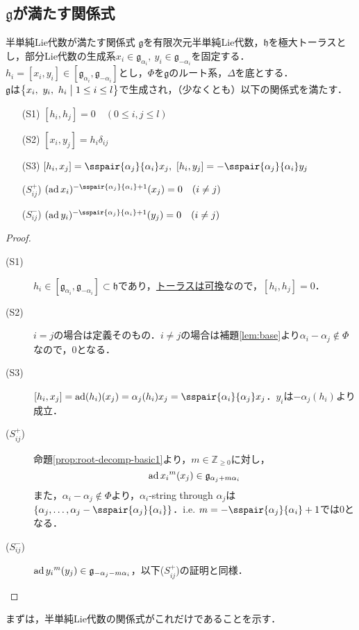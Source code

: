 \documentclass[rep_main]{subfiles}
\begin{document}
\subsection{$\mathfrak{g}$が満たす関係式}
\begin{myprop}[label=prop:semisimple-Lie-alg-relation]{半単純Lie代数が満たす関係式}
	$\mathfrak{g}$を有限次元半単純Lie代数，$\mathfrak{h}$を極大トーラスとし，部分Lie代数の生成系$x_i \in \mathfrak{g}_{\alpha_i},\ y_i \in \mathfrak{g}_{-\alpha_i}$を固定する．$h_i = [x_i, y_i] \in [\mathfrak{g}_{\alpha_i}, \mathfrak{g}_{-\alpha_i}]$とし，$\Phi$を$\mathfrak{g}$のルート系，$\Delta$を底とする．\\
	$\mathfrak{g}$は$\bigl\{ x_i,\ y_i,\ h_i \bigm| 1 \leq i \leq l \bigr\}$で生成され，（少なくとも）以下の関係式を満たす．
	\begin{enumerate}
		\item[(S1)] $[h_i, h_j] = 0\quad  (0 \leq i, j \leq l)$
		\item[(S2)] $[x_i, y_j] = h_i\delta_{ij}$
		\item[(S3)] $[h_i, x_j] = \sspair{\alpha_j}{\alpha_i}x_j,\ [h_i, y_j] = -\sspair{\alpha_j}{\alpha_i}y_j$
		\item[($S_{ij}^+$)] $(\ad x_i)^{-\sspair{\alpha_j}{\alpha_i} + 1}(x_j) = 0\quad  (i \neq j)$
		\item[($S_{ij}^-$)] $(\ad y_i)^{-\sspair{\alpha_j}{\alpha_i} + 1}(y_j) = 0\quad  (i \neq j)$
	\end{enumerate}
\end{myprop}
\begin{proof}
	\begin{description}
		\item[(S1)] $h_i  \in [\mathfrak{g}_{\alpha_i}, \mathfrak{g}_{-\alpha_i}] \subset \mathfrak{h}$であり，\hyperref[lem:torus]{トーラスは可換}なので，$[h_i, h_j] = 0$．
		\item[(S2)] $i = j$の場合は定義そのもの．$i \neq j$の場合は補題\ref{lem:base}より$\alpha_i - \alpha_j \notin \Phi$なので，$0$となる．
		\item[(S3)] $[h_i, x_j] = \ad(h_i)(x_j) = \alpha_j(h_i)x_j = \sspair{\alpha_i}{\alpha_j}x_j$．$y_i$は$-\alpha_j(h_i)$より成立．
		\item[($S_{ij}^+$)] 命題\ref{prop:root-decomp-basic1}より，$m \in \mathbb{Z}_{\geq 0}$に対し，
		\begin{equation}
			\operatorname{ad}{x_i}^{m}(x_j) \in \mathfrak{g}_{\alpha_j + m\alpha_i}
		\end{equation}
		また，\hyperref[lem:base]{$\alpha_i - \alpha_j \notin \Phi$}より，$\alpha_i$-string through $\alpha_j$は$\{\alpha_j, \ldots, \alpha_j - \sspair{\alpha_j}{\alpha_i}\}$．i.e. $m = -\sspair{\alpha_j}{\alpha_i} + 1$では$0$となる．
		\item[($S_{ij}^-$)] $\operatorname{ad}{y_i}^{m}(y_j) \in \mathfrak{g}_{-\alpha_j - m\alpha_i}$，以下($S_{ij}^+$)の証明と同様．
	\end{description}
\end{proof}
まずは，半単純Lie代数の関係式がこれだけであることを示す．
\end{document}

